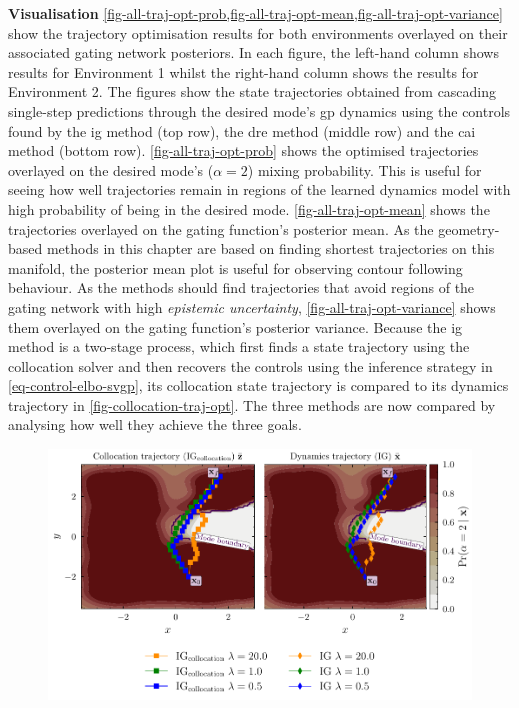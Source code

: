 \documentclass{mimosis-class/mimosis}
\numberwithin{equation}{chapter}
\newcommand{\modeVar}{\ensuremath{\alpha}}
\begin{document}
{\textbf{Visualisation}
\cref{fig-all-traj-opt-prob,fig-all-traj-opt-mean,fig-all-traj-opt-variance}
show the trajectory optimisation results for both environments overlayed on their associated gating network posteriors.
In each figure, the left-hand column shows results for Environment 1
whilst the right-hand column shows the results for Environment 2.
The figures show the state trajectories obtained from cascading single-step predictions through
the desired mode's  \acrshort{gp} dynamics
using the controls found by the \acrshort{ig} method (top row), the
\acrshort{dre} method (middle row) and the \acrshort{cai} method (bottom row).
\cref{fig-all-traj-opt-prob} shows the optimised trajectories overlayed on the desired
mode's (\(\modeVar=2\)) mixing probability.
This is useful for seeing how well trajectories remain in regions of the learned dynamics model with high
probability of being in the desired mode.
\cref{fig-all-traj-opt-mean} shows the trajectories overlayed on the gating function's posterior mean.
As the geometry-based methods in this chapter are based on finding shortest trajectories on this manifold,
the posterior mean plot is useful for observing contour following behaviour.
As the methods should find trajectories that avoid regions of the gating network with
high \emph{epistemic uncertainty}, \cref{fig-all-traj-opt-variance} shows them
overlayed on the gating function's posterior variance.
Because the \acrshort{ig} method is a two-stage process, which first finds a state trajectory using
the collocation solver and then recovers the controls using the inference strategy in \cref{eq-control-elbo-svgp},
its collocation state trajectory is compared to its dynamics trajectory in \cref{fig-collocation-traj-opt}.
The three methods are now compared by analysing how well they achieve the three goals.
\begin{figure}
\centering
\begin{minipage}[r]{\columnwidth}
\centering
\includegraphics[width=\textwidth]{./images/mode-opt/trajectory_optimisation/collocation_trajectories_over_desired_prob_scenario_7.pdf}

\end{minipage}
\end{figure}}
\end{document}
